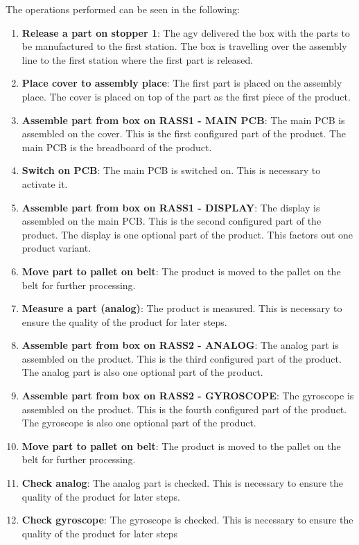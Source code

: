 The operations performed can be seen in the following:

\begin{enumerate}
  \item \textbf{Release a part on stopper 1}: The \gls{agv} delivered the box with the parts to be manufactured to the first station. The box is travelling over the assembly line to the first station where the first part is released.
  \item \textbf{Place cover to assembly place}: The first part is placed on the assembly place. The cover is placed on top of the part as the first piece of the product.
  \item \textbf{Assemble part from box on RASS1 - MAIN PCB}: The main PCB is assembled on the cover. This is the first configured part of the product. The main PCB is the breadboard of the product.
  \item \textbf{Switch on PCB}: The main PCB is switched on. This is necessary to activate it.
  \item \textbf{Assemble part from box on RASS1 - DISPLAY}: The display is assembled on the main PCB. This is the second configured part of the product. The display is one optional part of the product. This factors out one product variant.
  \item \textbf{Move part to pallet on belt}: The product is moved to the pallet on the belt for further processing.
  \item \textbf{Measure a part (analog)}: The product is measured. This is necessary to ensure the quality of the product for later steps.
  \item \textbf{Assemble part from box on RASS2 - ANALOG}: The analog part is assembled on the product. This is the third configured part of the product. The analog part is also one optional part of the product.
  \item \textbf{Assemble part from box on RASS2 - GYROSCOPE}: The gyroscope is assembled on the product. This is the fourth configured part of the product. The gyroscope is also one optional part of the product.
  \item \textbf{Move part to pallet on belt}: The product is moved to the pallet on the belt for further processing.
  \item \textbf{Check analog}: The analog part is checked. This is necessary to ensure the quality of the product for later steps.
  \item \textbf{Check gyroscope}: The gyroscope is checked. This is necessary to ensure the quality of the product for later steps

\end{enumerate}

